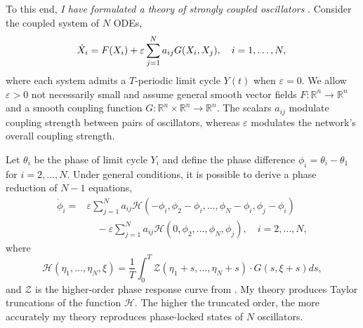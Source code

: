 \documentclass[a4paper,11pt]{article}
\newcommand{\ve}{\varepsilon}
\newcommand{\h}{\mathcal{H}}
\begin{document}
	To this end, \textit{I have formulated a theory of strongly coupled oscillators} \cite{park2020high}. Consider the coupled system of $N$ ODEs,
	\begin{equation}\label{eq:odes}
		\dot X_i = F(X_i) +\ve \sum_{j=1}^N a_{ij} G(X_i,X_j), \quad i=1,\ldots,N,\\
	\end{equation}
	where each system admits a $T$-periodic limit cycle $Y(t)$ when $\ve=0$. We allow $\ve>0$ not necessarily small and assume general smooth vector fields $F:\mathbb{R}^n \rightarrow \mathbb{R}^n$ and a smooth coupling function $G:\mathbb{R}^n\times\mathbb{R}^n\rightarrow \mathbb{R}^n$. The scalars $a_{ij}$ modulate coupling strength between pairs of oscillators, whereas $\ve$ modulates the network's overall coupling strength.
	
	Let $\theta_i$ be the phase of limit cycle $Y_i$ and define the phase difference $\phi_i=\theta_i-\theta_1$ for $i=2,\ldots,N$. Under general conditions, it is possible to derive a phase reduction of $N-1$ equations,
	\begin{align*}
		\dot \phi_i =& \ve\sum_{j=1}^N a_{ij} \h(-\phi_i,\phi_2-\phi_i,\ldots,\phi_N-\phi_i,\phi_j-\phi_i)\\
		&\quad- \ve\sum_{j=1}^N a_{ij} \h(0,\phi_2,\ldots,\phi_N,\phi_j), \quad i=2,\ldots,N,
	\end{align*}
	where
	\begin{equation*}
		\h(\eta_1,\ldots,\eta_N,\xi) = \frac{1}{T} \int_0^T \mathcal{Z}(\eta_1+s,\ldots,\eta_N+s) \cdot G(s,\xi+s)ds,
	\end{equation*}
	and $\mathcal{Z}$ is the higher-order phase response curve from \cite{wilson2020phase}. My theory produces Taylor truncations of the function $\h$. The higher the truncated order, the more accurately my theory reproduces phase-locked states of $N$ oscillators.
	
\end{document}
